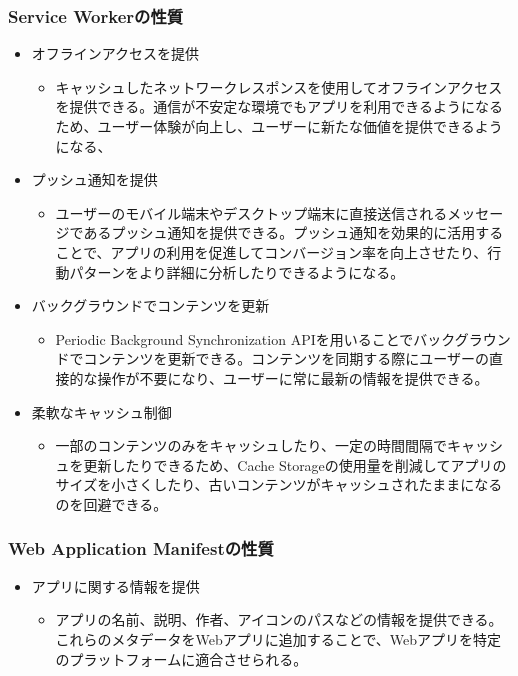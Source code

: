 \subsubsection{Service Workerの性質}\label{subsubsection:Service Workerの性質}
\begin{itemize}
    \item オフラインアクセスを提供
    \begin{itemize}
        \item キャッシュしたネットワークレスポンスを使用してオフラインアクセスを提供できる。通信が不安定な環境でもアプリを利用できるようになるため、ユーザー体験が向上し、ユーザーに新たな価値を提供できるようになる、
    \end{itemize}
    \item プッシュ通知を提供
    \begin{itemize}
        \item ユーザーのモバイル端末やデスクトップ端末に直接送信されるメッセージであるプッシュ通知を提供できる。プッシュ通知を効果的に活用することで、アプリの利用を促進してコンバージョン率を向上させたり、行動パターンをより詳細に分析したりできるようになる。
    \end{itemize}
    \item バックグラウンドでコンテンツを更新
    \begin{itemize}
        \item Periodic Background Synchronization APIを用いることでバックグラウンドでコンテンツを更新できる。コンテンツを同期する際にユーザーの直接的な操作が不要になり、ユーザーに常に最新の情報を提供できる。
    \end{itemize}
    \item 柔軟なキャッシュ制御
    \begin{itemize}
        \item 一部のコンテンツのみをキャッシュしたり、一定の時間間隔でキャッシュを更新したりできるため、Cache Storageの使用量を削減してアプリのサイズを小さくしたり、古いコンテンツがキャッシュされたままになるのを回避できる。
    \end{itemize}
\end{itemize}
\subsubsection{Web Application Manifestの性質}\label{subsubsection:Web Application Manifestの性質}
\begin{itemize}
    \item アプリに関する情報を提供
    \begin{itemize}
        \item アプリの名前、説明、作者、アイコンのパスなどの情報を提供できる。これらのメタデータをWebアプリに追加することで、Webアプリを特定のプラットフォームに適合させられる。
    \end{itemize}
\end{itemize}
